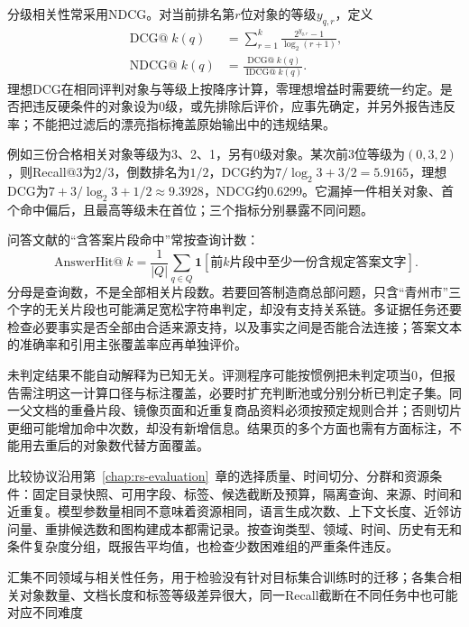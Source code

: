 分级相关性常采用NDCG。对当前排名第$r$位对象的等级$y_{q,r}$，定义
\begin{equation}
 \begin{split}
 \operatorname{DCG@}k(q)&=
 \sum_{r=1}^{k}\frac{2^{y_{q,r}}-1}{\log_2(r+1)},\\
 \operatorname{NDCG@}k(q)&=
 \frac{\operatorname{DCG@}k(q)}{\operatorname{IDCG@}k(q)}.
 \end{split}
 \label{eq:rs-search-ndcg}
\end{equation}
理想DCG在相同评判对象与等级上按降序计算，零理想增益时需要统一约定。是否把违反硬条件的对象设为0级，或先排除后评价，应事先确定，并另外报告违反率；不能把过滤后的漂亮指标掩盖原始输出中的违规结果。

例如三份合格相关对象等级为3、2、1，另有0级对象。某次前3位等级为$(0,3,2)$，则Recall@3为$2/3$，倒数排名为$1/2$，DCG约为$7/\log_2 3+3/2=5.9165$，理想DCG为$7+3/\log_2 3+1/2\approx9.3928$，NDCG约0.6299。它漏掉一件相关对象、首个命中偏后，且最高等级未在首位；三个指标分别暴露不同问题。

问答文献的“含答案片段命中”常按查询计数：
\begin{equation}
 \operatorname{AnswerHit@}k=
 \frac1{|Q|}\sum_{q\in Q}
 \mathbf1[\text{前}k\text{片段中至少一份含规定答案文字}].
 \label{eq:rs-search-answer-hit}
\end{equation}
分母是查询数，不是全部相关片段数。若要回答制造商总部问题，只含“青州市”三个字的无关片段也可能满足宽松字符串判定，却没有支持关系链。多证据任务还要检查必要事实是否全部由合适来源支持，以及事实之间是否能合法连接；答案文本的准确率和引用主张覆盖率应再单独评价。

未判定结果不能自动解释为已知无关。评测程序可能按惯例把未判定项当0，但报告需注明这一计算口径与标注覆盖，必要时扩充判断池或分别分析已判定子集。同一父文档的重叠片段、镜像页面和近重复商品资料必须按预定规则合并；否则切片更细可能增加命中次数，却没有新增信息。结果页的多个方面也需有方面标注，不能用去重后的对象数代替方面覆盖。

比较协议沿用第~\ref{chap:rs-evaluation}~章的选择质量、时间切分、分群和资源条件：固定目录快照、可用字段、标签、候选截断及预算，隔离查询、来源、时间和近重复。模型参数量相同不意味着资源相同，语言生成次数、上下文长度、近邻访问量、重排候选数和图构建成本都需记录。按查询类型、领域、时间、历史有无和条件复杂度分组，既报告平均值，也检查少数困难组的严重条件违反。

\Needspace{80mm}
汇集不同领域与相关性任务，用于检验没有针对目标集合训练时的迁移；各集合相关对象数量、文档长度和标签等级差异很大，同一Recall截断在不同任务中也可能对应不同难度

